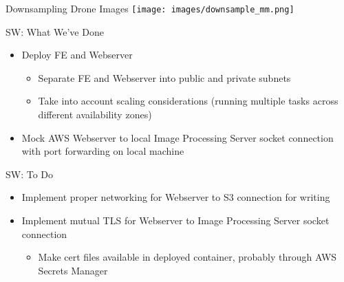 


\begin{frame}{Downsampling Drone Images}
    \centering
    \texttt{[image: images/downsample\_mm.png]}
\end{frame}

\begin{frame}{SW: What We've Done}
  \begin{itemize}
      \item Deploy FE and Webserver
      \begin{itemize}
          \item Separate FE and Webserver into public and private subnets
          \item Take into account scaling considerations (running multiple tasks across different availability zones)
      \end{itemize}
      \item Mock AWS Webserver to local Image Processing Server socket connection with port forwarding on local machine
  \end{itemize}
\end{frame}

\begin{frame}{SW: To Do}
  \begin{itemize}
      \item Implement proper networking for Webserver to S3 connection for writing
      \item Implement mutual TLS for Webserver to Image Processing Server socket connection
      \begin{itemize}
          \item Make cert files available in deployed container, probably through AWS Secrets Manager
      \end{itemize}
  \end{itemize}
\end{frame}

